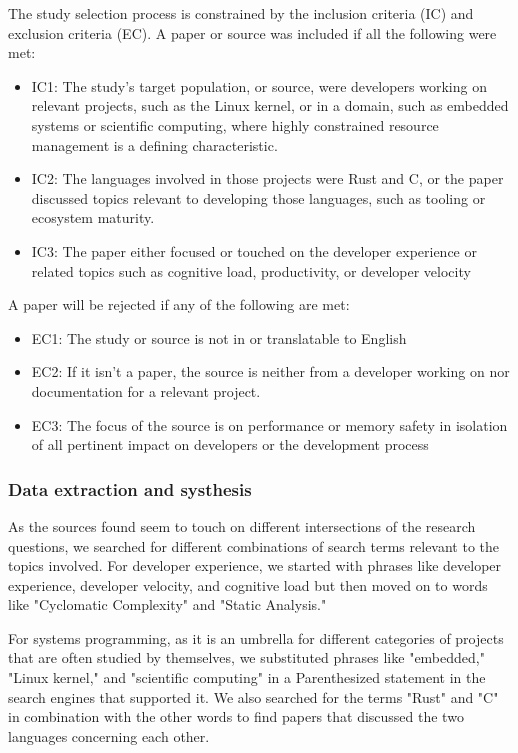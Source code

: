 \documentclass[conference]{IEEEtran}
\begin{document}
The study selection process is constrained by the inclusion criteria (IC) and exclusion criteria (EC). A paper or source was included if all the following were met:
\begin{itemize}
    \item IC1: The study's target population, or source, were developers working on relevant projects, such as the Linux kernel, or in a domain, such as embedded systems or scientific computing, where highly constrained resource management is a defining characteristic.
    \item IC2: The languages involved in those projects were Rust and C, or the paper discussed topics relevant to developing those languages, such as tooling or ecosystem maturity.
    \item IC3: The paper either focused or touched on the developer experience or related topics such as cognitive load, productivity, or developer velocity
\end{itemize}
A paper will be rejected if any of the following are met:
\begin{itemize}
    \item EC1: The study or source is not in or translatable to English
    \item EC2: If it isn't a paper, the source is neither from a developer working on nor documentation for a relevant project.
    \item EC3: The focus of the source is on performance or memory safety in isolation of all pertinent impact on developers or the development process
\end{itemize}

\subsubsection{\color{Black} Data extraction and systhesis}
\label{data_collection}

As the sources found seem to touch on different intersections of the research questions, we searched for different combinations of search terms relevant to the topics involved. For developer experience, we started with phrases like developer experience, developer velocity, and cognitive load but then moved on to words like "Cyclomatic Complexity" and "Static Analysis."

For systems programming, as it is an umbrella for different categories of projects that are often studied by themselves, we substituted phrases like "embedded," "Linux kernel," and "scientific computing" in a Parenthesized statement in the search engines that supported it. We also searched for the terms "Rust" and "C" in combination with the other words to find papers that discussed the two languages concerning each other.
\end{document}

